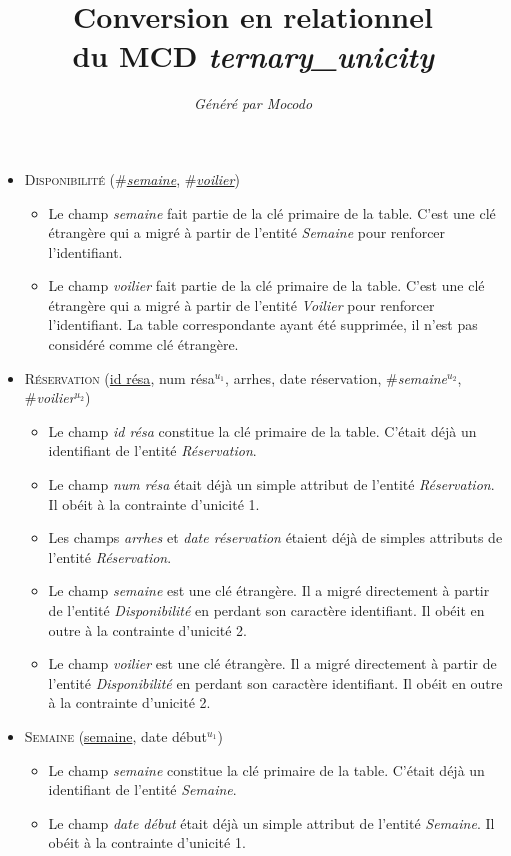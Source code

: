 \documentclass[a4paper]{article}
\title{Conversion en relationnel\\du MCD \emph{ternary_unicity}}
\author{\emph{Généré par Mocodo}}
\newcommand{\relat}[1]{\textsc{#1}}
\newcommand{\attr}[1]{#1}
\newcommand{\prim}[1]{\uline{#1}}
\newcommand{\foreign}[1]{\#\textsl{#1}}
\begin{document}
\maketitle

\begin{itemize}
  \item \relat{Disponibilité} (\foreign{\prim{semaine}}, \foreign{\prim{voilier}})
  \begin{itemize}
    \item Le champ \emph{semaine} fait partie de la clé primaire de la table. C'est une clé étrangère qui a migré à partir de l'entité \emph{Semaine} pour renforcer l'identifiant.
    \item Le champ \emph{voilier} fait partie de la clé primaire de la table. C'est une clé étrangère qui a migré à partir de l'entité \emph{Voilier} pour renforcer l'identifiant. La table correspondante ayant été supprimée, il n'est pas considéré comme clé étrangère.
  \end{itemize}

  \item \relat{Réservation} (\prim{id résa}, \attr{num résa}$^{u_1}$, \attr{arrhes}, \attr{date réservation}, \foreign{semaine}$^{u_2}$, \foreign{voilier}$^{u_2}$)
  \begin{itemize}
    \item Le champ \emph{id résa} constitue la clé primaire de la table. C'était déjà un identifiant de l'entité \emph{Réservation}.
    \item Le champ \emph{num résa} était déjà un simple attribut de l'entité \emph{Réservation}. Il obéit à la contrainte d'unicité 1.
    \item Les champs \emph{arrhes} et \emph{date réservation} étaient déjà de simples attributs de l'entité \emph{Réservation}.
    \item Le champ \emph{semaine} est une clé étrangère. Il a migré directement à partir de l'entité \emph{Disponibilité} en perdant son caractère identifiant. Il obéit en outre à la contrainte d'unicité 2.
    \item Le champ \emph{voilier} est une clé étrangère. Il a migré directement à partir de l'entité \emph{Disponibilité} en perdant son caractère identifiant. Il obéit en outre à la contrainte d'unicité 2.
  \end{itemize}

  \item \relat{Semaine} (\prim{semaine}, \attr{date début}$^{u_1}$)
  \begin{itemize}
    \item Le champ \emph{semaine} constitue la clé primaire de la table. C'était déjà un identifiant de l'entité \emph{Semaine}.
    \item Le champ \emph{date début} était déjà un simple attribut de l'entité \emph{Semaine}. Il obéit à la contrainte d'unicité 1.
  \end{itemize}

\end{itemize}
\end{document}

